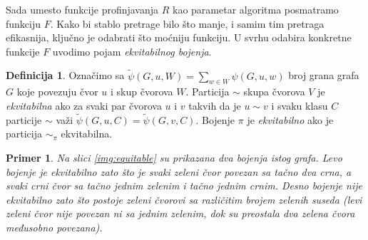 \documentclass[12pt,oneside]{memoir}
\newtheorem{example}{Primer}
\theoremstyle{definition}
\newtheorem*{definition}{Definicija}
\begin{document}
  Sada umesto funkcije profinjavanja $R$ kao parametar algoritma posmatramo
  funkciju $F$. Kako bi stablo pretrage bilo što manje, i samim tim pretraga
  efikasnija, ključno je odabrati što moćniju funkciju. U svrhu odabira
  konkretne funkcije $F$ uvodimo pojam \emph{ekvitabilnog bojenja}.

  \begin{definition}
	  Označimo sa $\widetilde{\psi}(G, u, W) = \sum_{w \in W} \psi(G, u, w)$ broj grana
	  grafa $G$ koje povezuju čvor $u$ i skup čvorova $W$.  Particija $\sim$
	  skupa čvorova $V$ je \emph{ekvitabilna} ako za svaki par čvorova $u$ i
	  $v$ takvih da je $u \sim v$ i svaku klasu $C$ particije $\sim$ važi
	  $\widetilde{\psi}(G, u, C) = \widetilde{\psi}(G, v, C)$.  Bojenje $\pi$ je \emph{ekvitabilno} ako
	  je particija $\sim_\pi$ ekvitabilna.
  \end{definition}

  \begin{example}
	  Na slici \ref{img:equitable} su prikazana dva bojenja istog grafa. Levo
	  bojenje je ekvitabilno zato što je svaki zeleni čvor povezan sa tačno dva
	  crna, a svaki crni čvor sa tačno jednim zelenim i tačno jednim crnim.
	  Desno bojenje nije ekvitabilno zato što postoje zeleni čvorovi sa
	  različitim brojem zelenih suseda (levi zeleni čvor nije povezan ni sa
	  jednim zelenim, dok su preostala dva zelena čvora međusobno povezana).
  \end{example}
\end{document}
